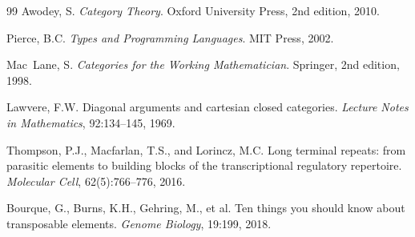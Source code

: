 \documentclass[12pt,a4paper]{article}
\begin{document}
\begin{thebibliography}{99}
Awodey, S.
\newblock \emph{Category Theory}.
\newblock Oxford University Press, 2nd edition, 2010.

Pierce, B.C.
\newblock \emph{Types and Programming Languages}.
\newblock MIT Press, 2002.

Mac~Lane, S.
\newblock \emph{Categories for the Working Mathematician}.
\newblock Springer, 2nd edition, 1998.

Lawvere, F.W.
\newblock Diagonal arguments and cartesian closed categories.
\newblock \emph{Lecture Notes in Mathematics}, 92:134--145, 1969.

Thompson, P.J., Macfarlan, T.S., and Lorincz, M.C.
\newblock Long terminal repeats: from parasitic elements to building blocks of
the transcriptional regulatory repertoire.
\newblock \emph{Molecular Cell}, 62(5):766--776, 2016.

Bourque, G., Burns, K.H., Gehring, M., et al.
\newblock Ten things you should know about transposable elements.
\newblock \emph{Genome Biology}, 19:199, 2018.

\end{thebibliography}
\end{document}
